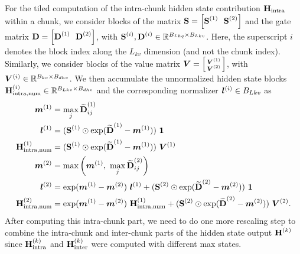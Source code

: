 \documentclass{article}
\begin{document}
    For the tiled computation of the intra-chunk hidden state contribution $\bm{\mathrm{H}}_\text{intra}$ within a chunk, we consider blocks of the matrix $\bm{\rS} = \left[\bm{\rS}^{(1)} \ \ \bm{\rS}^{(2)}\right]$ and the gate matrix $\bm{\rD} = \left[\bm{\rD}^{(1)} \ \ \bm{\rD}^{(2)}\right]$, with $\bm{\mathrm{S}}^{(i)}, \bm{\mathrm{D}}^{(i)} \in \mathbb{R}^{B_{Lhq} \times B_{Lkv}}$.
    Here, the superscript $i$ denotes the block index along the $L_{kv}$ dimension (and not the chunk index).
    Similarly, we consider blocks of the value matrix $\bm{V} = \left[ \begin{smallmatrix}
                \bm{V}^{(1)} \\ \bm{V}^{(2)}
            \end{smallmatrix} \right]$, with $\bm{V}^{(i)} \in \mathbb{R}^{B_{kv} \times B_{dhv}}$.
    We then accumulate the unnormalized hidden state blocks $\bm{\mathrm{H}}^{(i)}_\text{intra,num} \in \mathbb{R}^{B_{Lkv} \times B_{dhv}}$ and the corresponding normalizer $\bm{l}^{(i)} \in B_{Lkv}$ as
    \begin{align}
        \Bm^{(1)}                       & = \max_j \widetilde{\bm{\rD}}^{(1)}_{ij}                                                                                                              \\
        \Bl^{(1)}                       & = ( \bm{\rS}^{(1)} \odot \exp(\widetilde{\bm{\rD}}^{(1)} - \Bm^{(1)}) ) \  \bm{1}                                                                     \\
        \bm{\rH}^{(1)}_\text{intra,num} & = ( \bm{\rS}^{(1)} \odot \exp(\widetilde{\bm{\rD}}^{(1)} - \Bm^{(1)}) ) \ \BV^{(1)}                                                                   \\
        \Bm^{(2)}                       & = \max \left( \Bm^{(1)}, \ \max_j \widetilde{\bm{\rD}}^{(2)}_{ij} \right)                                                                             \\
        \Bl^{(2)}                       & = \exp(\Bm^{(1)} - \Bm^{(2)}) \ \Bl^{(1)} + ( \bm{\rS}^{(2)} \odot \exp(\widetilde{\bm{\rD}}^{(2)} - \Bm^{(2)}) ) \  \bm{1}                           \\
        \bm{\rH}^{(2)}_\text{intra,num} & = \exp(\Bm^{(1)} - \Bm^{(2)}) \ \bm{\rH}^{(1)}_\text{intra,num} + ( \bm{\rS}^{(2)} \odot \exp(\widetilde{\bm{\rD}}^{(2)} - \Bm^{(2)}) ) \  \BV^{(2)}.
    \end{align}
    After computing this intra-chunk part, we need to do one more rescaling step to combine the intra-chunk and inter-chunk parts of the hidden state output $\bm{\mathrm{H}}^{(k)}$ since $\bm{\mathrm{H}}^{(k)}_\text{intra}$ and $\bm{\mathrm{H}}^{(k)}_\text{inter}$ were computed with different max states.
\end{document}
